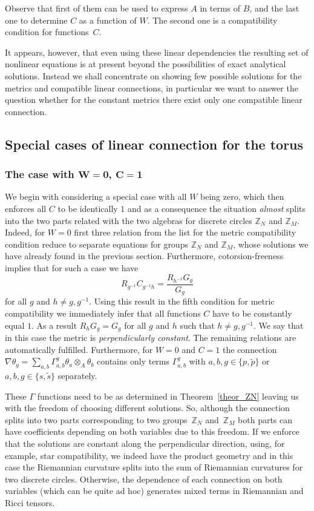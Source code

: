 \documentclass[10pt,a4paper]{amsart}
\numberwithin{equation}{section}
\newcommand{\ip}{{\tilde{p}}}
\newcommand{\is}{{\tilde{s}}}
\begin{document}
Observe that first of them can be used to express $A$ in terms of $B$, and the last one to determine $C$ as a function of $W$. The second one is a compatibility condition for functions~$C$.

It appears, however, that even using these linear dependencies the resulting set
of nonlinear equations is at present beyond the possibilities of exact analytical
solutions. Instead we shall concentrate on showing few possible solutions for
the metrics and compatible linear connections, in particular we want to answer
the question whether for the constant metrics there exist only one compatible
linear connection.

\subsection{Special cases of linear connection for the torus}

\subsubsection[The case with W=0, C=1]{The case with $\boldsymbol{W=0}$, $\boldsymbol{C=1}$}
We begin with considering a special case with all $W$ being zero, which then enforces all $C$ to be
identically $1$ and as a consequence the situation {\it almost} splits into the two parts related with the
two algebras for discrete circles $\mathbb{Z}_N$ and $\mathbb{Z}_M$.
Indeed, for $W=0$ first three relation from the list for the metric compatibility condition reduce to separate equations for groups $\mathbb{Z}_N$ and $\mathbb{Z}_M$, whose solutions we have already found in the previous section. Furthermore, cotorsion-freeness implies that for such a case we have
\[ R_{g^{-1}}C_{g^{-1}h}=\frac{R_{h^{-1}}G_g}{G_g}\]
for all $g$ and $h\neq g,g^{-1}$. Using this result in the fifth condition for metric compatibility we immediately infer that all functions $C$ have to be constantly equal $1$. As a result $R_{h}G_g=G_g$ for all $g$ and $h$ such that $h\neq g,g^{-1}$. We say that in this case the metric is {\it perpendicularly constant}. The remaining relations are automatically fulfilled. Furthermore, for $W=0$ and $C=1$ the connection $\nabla\theta_g=\sum_{a,b}\Gamma^g_{a,b}\theta_a\otimes_A\theta_b$ contains only terms $\Gamma^g_{a,b}$ with $a,b,g\in\{p,\ip\}$ or $a,b,g\in\{s,\is\}$ separately.

These $\Gamma$ functions need to be as determined in Theorem~\ref{theor_ZN} leaving us with the freedom of choosing different solutions. So, although the connection splits into two parts corresponding to two groups~$\mathbb Z_N$ and~$\mathbb Z_M$ both parts can have coefficients depending on both variables due to this freedom. If we enforce that the solutions are constant along the perpendicular direction, using, for example, star compatibility, we indeed have the product geometry and in this case the Riemannian curvature splits into the sum of Riemannian curvatures for two discrete circles. Otherwise, the dependence of each connection on both variables (which can be quite ad hoc) generates mixed terms in Riemannian and Ricci tensors.
\end{document}
